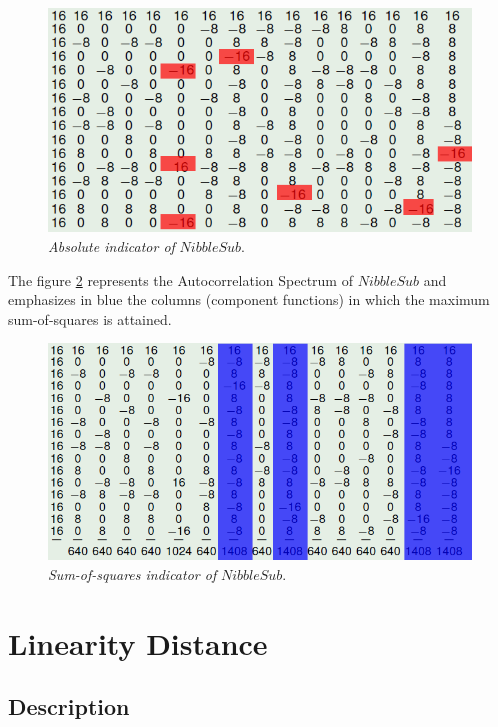 \begin{example}
\begin{figure}[htbp!]
\centering
\includegraphics[width=\textwidth]{maxac}
\caption[Absolute indicator of NibbleSub]{\textit{Absolute indicator of }$NibbleSub$.}
\label{fig:MAXAC}
\end{figure}

The figure \ref{fig:ssi} represents the Autocorrelation Spectrum of $NibbleSub$ and emphasizes in blue the columns (component functions) in which the maximum sum-of-squares is attained.

\begin{figure}[htbp!]
\centering
\includegraphics[width=\textwidth]{ssi}
\caption[Sum-of-squares indicator of NibbleSub]{\textit{Sum-of-squares indicator of }$NibbleSub$.}
\label{fig:ssi}
\end{figure}

\end{example}

\section{Linearity Distance}\label{sec:LinearityDistance}

\subsection{Description}

